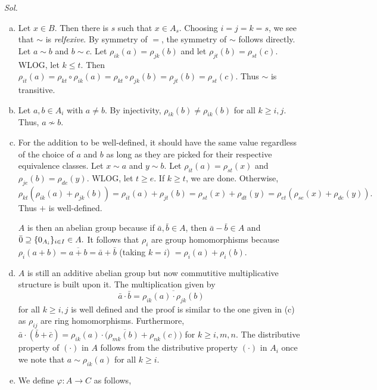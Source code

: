\documentclass{article}
\theoremstyle{definition}
\theoremstyle{remark}
\begin{document}
\textit{ Sol. }
\begin{enumerate}[(a)]
    \item Let $x \in B$. Then there is $s$ such that $x \in A_s$. Choosing $i = j = k = s$, we  see that $\sim$ is \textit{relfexive}.  By symmetry  of $=$, the symmetry of $\sim$ follows directly. Let $a \sim b$ and $b \sim c$. Let $\rho_{ik}(a) = \rho_{jk}(b)$ and let $\rho_{jt}(b) = \rho_{st}(c)$. WLOG, let $k \leq t$. Then $\rho_{it}(a) = \rho_{kt}\circ\rho_{ik}(a) = \rho_{kt}\circ \rho_{jk}(b) = \rho_{jt}(b) = \rho_{st}(c).$ Thus $\sim$ is transitive.
    
    \item Let $a, b \in A_i$ with $a \neq b.$ By injectivity, $\rho_{ik}(b) \neq \rho_{ik}(b)$ for all $k \geq i, j$. Thus, $a \nsim b$.
    
    \item For the addition to be well-defined, it should have the same value regardless of the choice of $a$ and $b$ as long as  they are picked for their respective equivalence classes. Let $x \sim a$ and $y \sim b.$ Let $\rho_{it}(a) = \rho_{st}(x)$ and $\rho_{je}(b) = \rho_{de}(y).$ WLOG, let $t \geq e.$ If $k \geq t$, we are done. Otherwise,  $\rho_{kt}(\rho_{ik}(a) + \rho_{jk}(b)) = \rho_{it}(a) + \rho_{jt}(b) = \rho_{st}(x) + \rho_{dt}(y) = \rho_{et}(\rho_{se}(x) + \rho_{de}(y)).$ Thus $+$ is well-defined.
    
    $A$ is then an abelian group because if $\bar{a}, \bar{b} \in A$, then $\bar{a} -  \bar{b} \in A$ and $\bar{0} \supseteq \{0_{A_i}\}_{i \in I} \in A.$ It follows that $\rho_i$ are group homomorphisms because  $\rho_i(a + b) = \overline{a + b} = \bar{a} + \bar{b}$ (taking $k = i$) $ = \rho_i(a) + \rho_i(b).$

    \item $A$ is still an additive abelian group but now commutitive multiplicative structure is built upon it. The multiplication given by 
        $$\bar{a} \cdot \bar{b} = \overline{\rho_{ik}(a) \cdot \rho_{jk}(b)}$$
    for all $k \geq i, j$ is well defined and the proof is similar to the one given in (c) as $\rho_{ij}$ are ring homomorphisms.  Furthermore, $\bar{a}\cdot(\bar{b} + \bar{c}) = \overline{\rho_{ik}(a) \cdot (\rho_{mk}(b) + \rho_{nk}(c)})$ for $k \geq i, m,n$. The distributive property of $(\cdot)$ in $A$ follows from the distributive property $(\cdot)$ in $A_i$ once we note that $a \sim \rho_{ik}(a)$ for all $k \geq  i$.

    \item We define $\varphi: A \to C$ as follows,
    

\end{enumerate}
\end{document}
